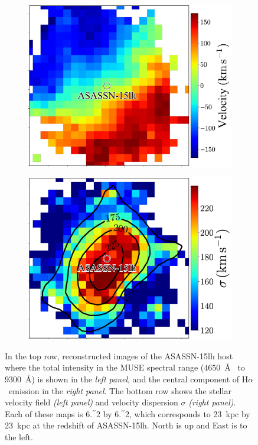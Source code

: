 \documentclass[traditabstract]{aa}
\newcommand{\farc}{\hbox{$.\!\!^{\prime\prime}$}}
\newcommand{\ha}{H$\alpha$}
\begin{document}
\begin{figure}
\begin{subfigure}{.2425\textwidth}
  \includegraphics[width=1.0\linewidth]{fig/MUSE_ASASSN-15lh_velo.pdf}
\end{subfigure}
\begin{subfigure}{.2425\textwidth}
  \includegraphics[width=1.0\linewidth]{fig/MUSE_ASASSN-15lh_sigma.pdf}
\end{subfigure}
\caption{In the top row, reconstructed images of the ASASSN-15lh host where the total intensity in the MUSE spectral range ($4650$~\AA~ to $9300$~\AA) is shown in the \textit{left panel}, and the central component of \ha~emission in the \textit{right panel}. The bottom row shows the stellar velocity field \textit{(left panel)} and velocity dispersion $\sigma$ \textit{(right panel)}. Each of these maps is 6\farc{2} by 6\farc{2}, which corresponds to 23~kpc by 23~kpc at the redshift of ASASSN-15lh. North is up and East is to the left.}
\label{fig:sig_maps}
\end{figure}
\end{document}
